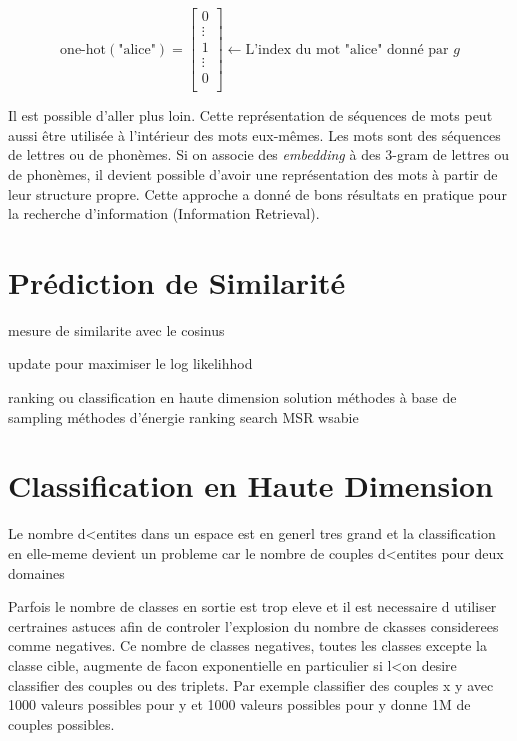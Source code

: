\begin{equation}
\label{eq:onehot}
\textrm{one-hot}(\textrm{"alice"}) =
\begin{bmatrix}
0\\
\vdots\\
1\\
\vdots\\
0\\
\end{bmatrix} 
\leftarrow \textrm{L'index du mot "alice" donné par $g$}
\end{equation}


Il est possible d'aller plus loin. Cette représentation de séquences de mots
peut aussi être utilisée à l'intérieur des mots eux-mêmes. Les mots sont des
séquences de lettres ou de phonèmes. Si on associe des {\it embedding} à des
3-gram de lettres ou de phonèmes, il devient possible d'avoir une
représentation des mots à partir de leur structure propre.  Cette approche
\citep{rnn58} a donné de bons résultats en pratique pour la recherche
d'information (Information Retrieval).

\section{Prédiction de Similarité}

mesure de similarite avec le cosinus

update pour maximiser le log likelihhod

ranking ou classification en haute dimension
solution méthodes à base de sampling
méthodes d'énergie ranking
search MSR
wsabie

\section{Classification en Haute Dimension}

Le nombre d<entites dans un espace est en generl tres grand et la
classification en elle-meme devient un probleme car le nombre de couples
d<entites pour deux domaines

Parfois le nombre de classes en sortie est trop eleve et il est necessaire d
utiliser certraines astuces afin de controler l'explosion du nombre de ckasses
considerees comme negatives. Ce nombre de classes negatives, toutes les classes
excepte la classe cible, augmente de facon exponentielle en particulier si l<on
desire classifier des couples ou des triplets. Par exemple classifier des
couples x y avec 1000 valeurs possibles pour y et 1000 valeurs possibles pour y
donne 1M de couples possibles.

